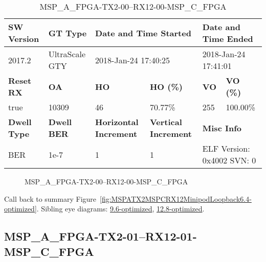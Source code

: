 \begin{table}[h]
\centering
\caption{MSP\_A\_FPGA-TX2-00--RX12-00-MSP\_C\_FPGA}
\label{tab:MSPAFPGATX200RX1200MSPCFPGA6.4-optimized}
\begin{tabular}{@{}|l|l|l|l|l|l|@{}}
\toprule
\textbf{SW Version}                & \textbf{GT Type}   & \multicolumn{2}{l|}{\textbf{Date and Time Started}}            & \multicolumn{2}{l|}{\textbf{Date and Time Ended}}        \\ \midrule
2017.2                       & UltraScale GTY          & \multicolumn{2}{l|}{2018-Jan-24 17:40:25}                   & \multicolumn{2}{l|}{2018-Jan-24 17:41:01}               \\ \midrule
\textbf{Reset RX}                  & \textbf{OA} & \textbf{HO}   & \textbf{HO (\%)} & \textbf{VO} & \textbf{VO (\%)} \\ \midrule
true & 10309        & 46          & 70.77\%        & 255        & 100.00\%       \\ \midrule
\textbf{Dwell Type}                & \textbf{Dwell BER} & \textbf{Horizontal Increment} & \textbf{Vertical Increment}    & \multicolumn{2}{l|}{\textbf{Misc Info}}                  \\ \midrule
BER                            & 1e-7        & 1        & 1           & \multicolumn{2}{l|}{ELF Version: 0x4002 SVN: 0}                         \\ \bottomrule
\end{tabular}
\end{table}

\begin{figure}[h]
\caption{MSP\_A\_FPGA-TX2-00--RX12-00-MSP\_C\_FPGA} \label{fig:MSPAFPGATX200RX1200MSPCFPGA6.4-optimized}
\end{figure}

Call back to summary Figure~\ref{fig:MSPATX2MSPCRX12MinipodLoopback6.4-optimized}.
Sibling eye diagrams: \hyperref[sec:MSPAFPGATX200RX1200MSPCFPGA9.6-optimized]{9.6-optimized}, \hyperref[sec:MSPAFPGATX200RX1200MSPCFPGA12.8-optimized]{12.8-optimized}.

\clearpage
\newpage


\subsection{MSP\_A\_FPGA-TX2-01--RX12-01-MSP\_C\_FPGA}\label{sec:MSPAFPGATX201RX1201MSPCFPGA6.4-optimized}

